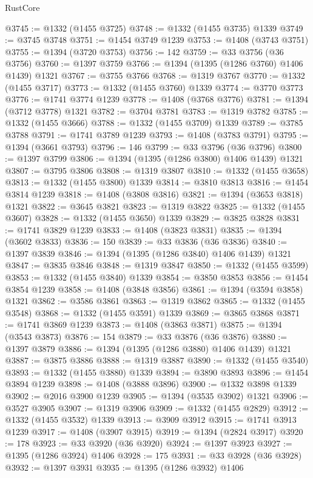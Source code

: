 \begin{lexlean}{RustCore}
\begin{coremodule}
@3745 := @1332 (@1455 @3725)
@3748 := @1332 (@1455 @3735) @1339
@3749 := @3745 @3748
@3751 := @1454 @3749 @1239
@3753 := @1408 (@3743 @3751)
@3755 := @1394 (@3720 @3753)
@3756 := 142
@3759 := @33 @3756 (@36 @3756)
@3760 := @1397 @3759
@3766 := @1394 (@1395 (@1286 @3760) @1406 @1439) @1321
@3767 := @3755 @3766
@3768 := @1319 @3767
@3770 := @1332 (@1455 @3717)
@3773 := @1332 (@1455 @3760) @1339
@3774 := @3770 @3773
@3776 := @1741 @3774 @1239
@3778 := @1408 (@3768 @3776)
@3781 := @1394 (@3712 @3778) @1321
@3782 := @3704 @3781
@3783 := @1319 @3782
@3785 := @1332 (@1455 @3666)
@3788 := @1332 (@1455 @3709) @1339
@3789 := @3785 @3788
@3791 := @1741 @3789 @1239
@3793 := @1408 (@3783 @3791)
@3795 := @1394 (@3661 @3793)
@3796 := 146
@3799 := @33 @3796 (@36 @3796)
@3800 := @1397 @3799
@3806 := @1394 (@1395 (@1286 @3800) @1406 @1439) @1321
@3807 := @3795 @3806
@3808 := @1319 @3807
@3810 := @1332 (@1455 @3658)
@3813 := @1332 (@1455 @3800) @1339
@3814 := @3810 @3813
@3816 := @1454 @3814 @1239
@3818 := @1408 (@3808 @3816)
@3821 := @1394 (@3653 @3818) @1321
@3822 := @3645 @3821
@3823 := @1319 @3822
@3825 := @1332 (@1455 @3607)
@3828 := @1332 (@1455 @3650) @1339
@3829 := @3825 @3828
@3831 := @1741 @3829 @1239
@3833 := @1408 (@3823 @3831)
@3835 := @1394 (@3602 @3833)
@3836 := 150
@3839 := @33 @3836 (@36 @3836)
@3840 := @1397 @3839
@3846 := @1394 (@1395 (@1286 @3840) @1406 @1439) @1321
@3847 := @3835 @3846
@3848 := @1319 @3847
@3850 := @1332 (@1455 @3599)
@3853 := @1332 (@1455 @3840) @1339
@3854 := @3850 @3853
@3856 := @1454 @3854 @1239
@3858 := @1408 (@3848 @3856)
@3861 := @1394 (@3594 @3858) @1321
@3862 := @3586 @3861
@3863 := @1319 @3862
@3865 := @1332 (@1455 @3548)
@3868 := @1332 (@1455 @3591) @1339
@3869 := @3865 @3868
@3871 := @1741 @3869 @1239
@3873 := @1408 (@3863 @3871)
@3875 := @1394 (@3543 @3873)
@3876 := 154
@3879 := @33 @3876 (@36 @3876)
@3880 := @1397 @3879
@3886 := @1394 (@1395 (@1286 @3880) @1406 @1439) @1321
@3887 := @3875 @3886
@3888 := @1319 @3887
@3890 := @1332 (@1455 @3540)
@3893 := @1332 (@1455 @3880) @1339
@3894 := @3890 @3893
@3896 := @1454 @3894 @1239
@3898 := @1408 (@3888 @3896)
@3900 := @1332 @3898 @1339
@3902 := @2016 @3900 @1239
@3905 := @1394 (@3535 @3902) @1321
@3906 := @3527 @3905
@3907 := @1319 @3906
@3909 := @1332 (@1455 @2829)
@3912 := @1332 (@1455 @3532) @1339
@3913 := @3909 @3912
@3915 := @1741 @3913 @1239
@3917 := @1408 (@3907 @3915)
@3919 := @1394 (@2824 @3917)
@3920 := 178
@3923 := @33 @3920 (@36 @3920)
@3924 := @1397 @3923
@3927 := @1395 (@1286 @3924) @1406
@3928 := 175
@3931 := @33 @3928 (@36 @3928)
@3932 := @1397 @3931
@3935 := @1395 (@1286 @3932) @1406

\end{coremodule}
\end{lexlean}
